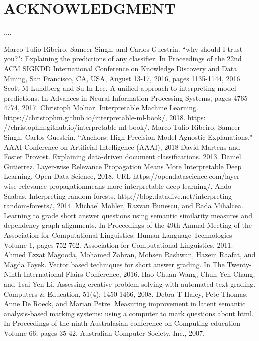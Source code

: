 \documentclass[letterpaper, 10 pt, conference]{ieeeconf}  %
\begin{document}

\section*{ACKNOWLEDGMENT}

....



\begin{thebibliography}{99}

 Marco Tulio Ribeiro, Sameer Singh, and Carlos Guestrin. ``why should I trust you?": Explaining the predictions of any classifier. In Proceedings of the 22nd ACM SIGKDD International Conference on Knowledge Discovery and Data Mining, San Francisco, CA, USA, August 13-17, 2016, pages 1135-1144, 2016.
 Scott M Lundberg and Su-In Lee. A unified approach to interpreting model predictions. In Advances in Neural Information Processing Systems, pages 4765-4774, 2017.
 Christoph Molnar. Interpretable Machine Learning.
https://christophm.github.io/interpretable-ml-book/, 2018. https:
//christophm.github.io/interpretable-ml-book/.
 Marco Tulio Ribeiro, Sameer Singh, Carlos Guestrin. ``Anchors: High-Precision Model-Agnostic Explanations." AAAI Conference on Artificial Intelligence (AAAI), 2018
 David Martens and Foster Provost. Explaining data-driven document classifications. 2013.
 Daniel Gutierrez. Layer-wise Relevance Propagation Means More
Interpretable Deep Learning. Open Data Science, 2018. URL
https://opendatascience.com/layer-wise-relevance-propagationmeans-more-interpretable-deep-learning/.
 Ando Saabas. Interpreting random forests. http://blog.datadive.net/interpreting-random-forests/, 2014.
 Michael Mohler, Razvan Bunescu, and Rada Mihalcea. Learning to grade short answer questions using semantic similarity measures and dependency graph alignments. In Proceedings of the 49th Annual Meeting of the Association for Computational Linguistics: Human Language Technologies-Volume 1, pages 752-762. Association for Computational Linguistics, 2011.
 Ahmed Ezzat Magooda, Mohamed Zahran, Mohsen Rashwan, Hazem Raafat, and Magda Fayek. Vector based techniques for short answer grading. In The Twenty-Ninth International Flairs Conference, 2016.
 Hao-Chuan Wang, Chun-Yen Chang, and Tsai-Yen Li. Assessing creative problem-solving with automated text grading. Computers \& Education, 51(4): 1450-1466, 2008.
 Debra T Haley, Pete Thomas, Anne De Roeck, and Marian Petre. Measuring improvement in latent semantic analysis-based marking systems: using a computer to mark questions about html. In Proceedings of the ninth Australasian conference on Computing education-Volume 66, pages 35-42. Australian Computer Society, Inc., 2007.
\end{thebibliography}
\end{document}
